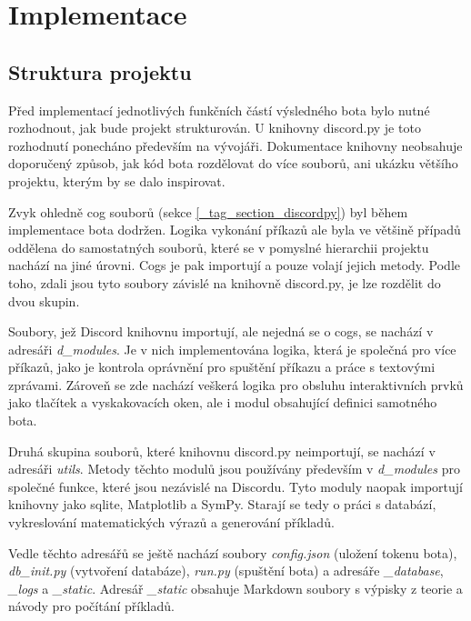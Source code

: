 \documentclass[FM]{tulthesis}
\begin{document}
	\section{Implementace}\label{Chapter5_2}
	
	\subsection{Struktura projektu}

	Před implementací jednotlivých funkčních částí výsledného bota bylo nutné rozhodnout, jak bude projekt strukturován. U knihovny discord.py je toto rozhodnutí ponecháno především na vývojáři. Dokumentace knihovny neobsahuje doporučený způsob, jak kód bota rozdělovat do více souborů, ani ukázku většího projektu, kterým by se dalo inspirovat.
	
	Zvyk ohledně cog souborů (sekce \ref{_tag_section_discordpy}) byl během implementace bota dodržen. Logika vykonání příkazů ale byla ve většině případů oddělena do samostatných souborů, které se v pomyslné hierarchii projektu nachází na jiné úrovni. Cogs je pak importují a pouze volají jejich metody. Podle toho, zdali jsou tyto soubory závislé na knihovně discord.py, je lze rozdělit do dvou skupin.
	
	Soubory, jež Discord knihovnu importují, ale nejedná se o cogs, se nachází v adresáři \textit{d\_modules}. Je v nich implementována logika, která je společná pro více příkazů, jako je kontrola oprávnění pro spuštění příkazu a práce s textovými zprávami. Zároveň se zde nachází veškerá logika pro obsluhu interaktivních prvků jako tlačítek a vyskakovacích oken, ale i modul obsahující definici samotného bota.
	
	Druhá skupina souborů, které knihovnu discord.py neimportují, se nachází v adresáři \textit{utils}. Metody těchto modulů jsou používány především v \textit{d\_modules} pro společné funkce, které jsou nezávislé na Discordu. Tyto moduly naopak importují knihovny jako sqlite, Matplotlib a SymPy. Starají se tedy o práci s databází, vykreslování matematických výrazů a generování příkladů.
	
	Vedle těchto adresářů se ještě nachází soubory \textit{config.json} (uložení tokenu bota), \textit{db\_init.py} (vytvoření databáze), \textit{run.py} (spuštění bota) a adresáře \textit{\_database}, \textit{\_logs} a \textit{\_static}. Adresář \textit{\_static} obsahuje Markdown soubory s výpisky z teorie a návody pro počítání příkladů.
	
\end{document}
